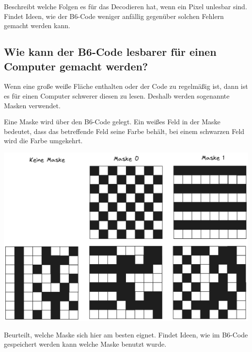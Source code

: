 \documentclass[a5paper]{scrartcl}
\begin{document}
\begin{aufgabe}
	\begin{teilaufgaben}
		\teilaufgabe {} Beschreibt welche Folgen es für das Decodieren hat, wenn ein Pixel unlesbar sind.
		\teilaufgabe {} Findet Ideen, wie der B6-Code weniger anfällig gegenüber solchen Fehlern gemacht werden kann.
	\end{teilaufgaben}
\end{aufgabe}

\newpage

\subsection*{Wie kann der B6-Code lesbarer für einen Computer gemacht werden?}

Wenn eine große weiße Fläche enthalten oder der Code zu regelmäßig ist, dann ist es für einen Computer schwerer diesen zu lesen. Deshalb werden sogenannte Masken verwendet.

Eine Maske wird über den B6-Code gelegt. Ein weißes Feld in der Maske bedeutet, dass das betreffende Feld seine Farbe behält, bei einem schwarzen Feld wird die Farbe umgekehrt.

\begin{center}
	\includegraphics[width=0.8\linewidth]{./b6code-maske.excalidraw.png}
\end{center}

\begin{aufgabe}
	\begin{teilaufgaben}
		\teilaufgabe {} Beurteilt, welche Maske sich hier am besten eignet.
		\teilaufgabe {} Findet Ideen, wie im B6-Code gespeichert werden kann welche Maske benutzt wurde.
	\end{teilaufgaben}
\end{aufgabe}
\end{document}
